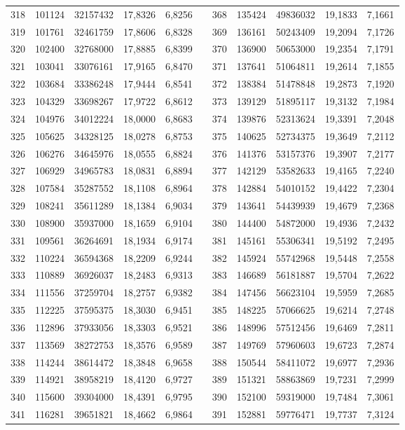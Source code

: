 \begin{longtable}{rrrrrrrrrrr}
318&101124&32157432&17,8326&6,8256&&368&135424&49836032&19,1833&7,1661\\
319&101761&32461759&17,8606&6,8328&&369&136161&50243409&19,2094&7,1726\\
320&102400&32768000&17,8885&6,8399&&370&136900&50653000&19,2354&7,1791\\
321&103041&33076161&17,9165&6,8470&&371&137641&51064811&19,2614&7,1855\\
322&103684&33386248&17,9444&6,8541&&372&138384&51478848&19,2873&7,1920\\
323&104329&33698267&17,9722&6,8612&&373&139129&51895117&19,3132&7,1984\\
324&104976&34012224&18,0000&6,8683&&374&139876&52313624&19,3391&7,2048\\
325&105625&34328125&18,0278&6,8753&&375&140625&52734375&19,3649&7,2112\\
326&106276&34645976&18,0555&6,8824&&376&141376&53157376&19,3907&7,2177\\
327&106929&34965783&18,0831&6,8894&&377&142129&53582633&19,4165&7,2240\\
328&107584&35287552&18,1108&6,8964&&378&142884&54010152&19,4422&7,2304\\
329&108241&35611289&18,1384&6,9034&&379&143641&54439939&19,4679&7,2368\\
330&108900&35937000&18,1659&6,9104&&380&144400&54872000&19,4936&7,2432\\
331&109561&36264691&18,1934&6,9174&&381&145161&55306341&19,5192&7,2495\\
332&110224&36594368&18,2209&6,9244&&382&145924&55742968&19,5448&7,2558\\
333&110889&36926037&18,2483&6,9313&&383&146689&56181887&19,5704&7,2622\\
334&111556&37259704&18,2757&6,9382&&384&147456&56623104&19,5959&7,2685\\
335&112225&37595375&18,3030&6,9451&&385&148225&57066625&19,6214&7,2748\\
336&112896&37933056&18,3303&6,9521&&386&148996&57512456&19,6469&7,2811\\
337&113569&38272753&18,3576&6,9589&&387&149769&57960603&19,6723&7,2874\\
338&114244&38614472&18,3848&6,9658&&388&150544&58411072&19,6977&7,2936\\
339&114921&38958219&18,4120&6,9727&&389&151321&58863869&19,7231&7,2999\\
340&115600&39304000&18,4391&6,9795&&390&152100&59319000&19,7484&7,3061\\
341&116281&39651821&18,4662&6,9864&&391&152881&59776471&19,7737&7,3124\\

\end{longtable}
